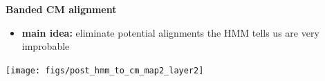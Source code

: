 \documentclass[landscape]{slides}
\begin{document}
\begin{slide}
\begin{center}
\large
\textbf{Banded CM alignment}
\end{center}
\medskip
\small
\begin{itemize}
\item
\textbf{main idea:} eliminate potential alignments the HMM tells us are very improbable
\end{itemize}
\begin{center}
\texttt{[image: figs/post\_hmm\_to\_cm\_map2\_layer2]}
\end{center}
\vfill
\end{slide}
\end{document}
